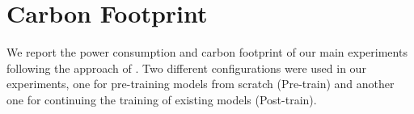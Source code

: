 \section{Carbon Footprint}\label{carbon-footprint}

\begin{table}[t]
    \centering\small
    \caption{Average power draw, number of models trained, training times in hours, mean power consumption including power usage effectiveness (PUE), and CO\textsubscript{2} emissions; for each setting.}
    \label{tab:carbon-bertrade}
\end{table}

We report the power consumption and carbon footprint of our main experiments following the approach of \citet{strubell-etal-2019-energy}. Two different configurations were used in our experiments, one for pre-training models from scratch (Pre-train) and another one for continuing the training of existing models (Post-train).

